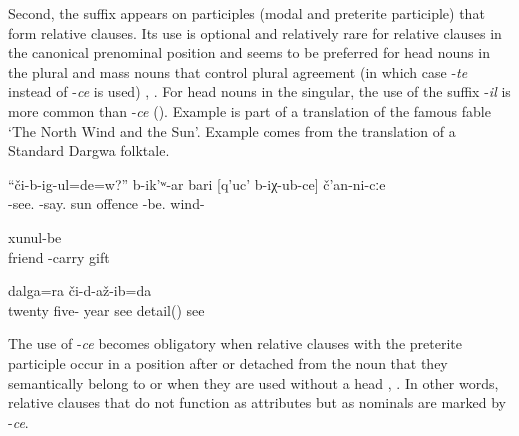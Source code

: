 Second, the suffix appears on participles (modal and preterite participle) that form relative clauses. Its use is optional and relatively rare for relative clauses in the canonical prenominal position and seems to be preferred for head nouns in the plural and mass nouns that control plural agreement (in which case -\textit{te} instead of -\textit{ce} is used) , . For head nouns in the singular, the use of the suffix -\textit{il} is more common than -\textit{ce} (). Example  is part of a translation of the famous fable `The North Wind and the Sun’. Example  comes from the translation of a Standard Dargwa folktale. 

\begin{exe}

\ex	\label{Do you see?'' said the sun to the offended wind.}
\gll ``či-b-ig-ul=de=w?''	b-ik'ʷ-ar	bari	[q'uc'	b-iχ-ub-ce]	č'an-ni-cːe\\
-see.	-say.	sun	offence	-be.	wind-\\
\glt {}

	\ex	\label{ex:the gifts that the friends had brought to him@16a}
		xunul-be\\
		friend		-carry	gift\\
	\glt	{}
	
			\ex	\label{ex:I saw the details that I did not see for 25 years}
		dalga=ra	či-d-až-ib=da\\
		twenty	five-	year	see 	detail()	see\\
	\glt	{}
\end{exe}

The use of -\textit{ce} becomes obligatory when relative clauses with the preterite participle occur in a position after or detached from the noun that they semantically belong to  or when they are used without a head , . In other words, relative clauses that do not function as attributes but as nominals are marked by -\textit{ce}.

